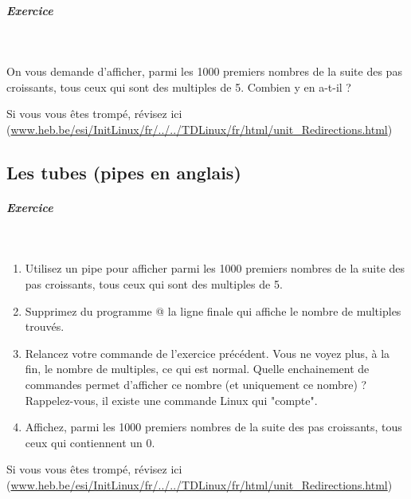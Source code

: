 \documentclass[11pt,a4paper]{article}
\begin{document}
		\subparagraph{Exercice} 
		
					\textcolor{white}{.} \par
				
            \par
        
					On vous demande d'afficher,
					parmi les 1000 premiers nombres 
					de la suite des pas croissants,
					tous ceux qui sont des multiples de 5.
					Combien y en a-t-il ?
				
            \par
        Si vous vous \^etes tromp\'e, r\'evisez ici (\url{www.heb.be/esi/InitLinux/fr/../../TDLinux/fr/html/unit\_Redirections.html})
            \par
        \subsection{Les tubes (pipes en anglais)}
			
		\subparagraph{Exercice} 
		
					\textcolor{white}{.} \par
				
            \par
        
					\begin{enumerate}
				
			\item 
              Utilisez un pipe pour afficher
              parmi les 1000 premiers nombres 
              de la suite des pas croissants,
              tous ceux qui sont des multiples de 5.
            
			\item 
              Supprimez du programme
              @
              la ligne finale qui affiche 
              le nombre de multiples trouv\'es. 
            
			\item 
              Relancez votre commande de l'exercice pr\'ec\'edent.
              Vous ne voyez plus, \`a la fin,
              le nombre de multiples, ce qui est normal.
              Quelle enchainement de commandes
              permet d'afficher ce nombre
              (et uniquement ce nombre) ?
              Rappelez-vous,
              il existe une commande Linux qui "compte". 
            
			\item 
              Affichez,
              parmi les 1000 premiers nombres 
              de la suite des pas croissants,
              tous ceux qui contiennent un 0.
            
					\end{enumerate}
				 Si vous vous \^etes tromp\'e, r\'evisez ici (\url{www.heb.be/esi/InitLinux/fr/../../TDLinux/fr/html/unit\_Redirections.html})
            \par
\end{document}
